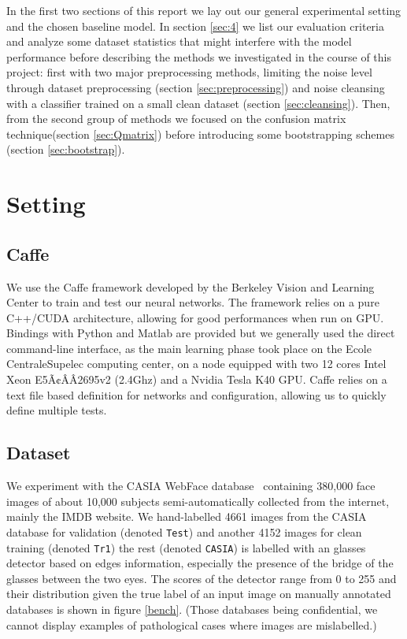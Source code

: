 \documentclass[a4paper]{article}
\begin{document}
    In the first two sections of this report we lay out our general experimental setting and the chosen baseline model. In section \ref{sec:4} we list our evaluation criteria and analyze some dataset statistics that might interfere with the model performance before describing the methods we investigated in the course of this project: first with two major preprocessing methods, limiting the noise level through dataset preprocessing (section \ref{sec:preprocessing}) and noise cleansing with a classifier trained on a small clean dataset (section \ref{sec:cleansing}). Then, from the second group of methods we focused on the confusion matrix technique\cite{Sukhbaatar:Qk8RHYrX}(section \ref{sec:Qmatrix}) before introducing some bootstrapping schemes (section \ref{sec:bootstrap}). 

\section{Setting}

	\subsection{Caffe}
	We use the Caffe framework \cite{jia2014caffe} developed by the Berkeley Vision and Learning Center to train and test our neural networks. The framework relies on a pure C++/CUDA architecture, allowing for good performances when run on GPU. Bindings with Python and Matlab are provided but we generally used the direct command-line interface, as the main learning phase took place on the Ecole CentraleSupelec computing center, on a node equipped with two 12 cores Intel Xeon E5Ã¢ÂÂ2695v2 (2.4Ghz) and a Nvidia Tesla K40 GPU. Caffe relies on a text file based definition for networks and configuration, allowing us to quickly define multiple tests.
		
	\subsection{Dataset}
	We experiment with the CASIA WebFace database~\cite{yi2014learning} containing 380,000 face images of about 10,000 subjects semi-automatically collected from the internet, mainly the IMDB website. We hand-labelled 4661 images from the CASIA database for validation (denoted \texttt{Test}) and another 4152 images for clean training (denoted \texttt{Tr1}) the rest (denoted \texttt{CASIA}) is labelled with an glasses detector based on edges information, especially the presence of the bridge of the glasses between the two eyes. The scores of the detector range from 0 to 255 and their distribution given the true label of an input image on manually annotated databases is shown in figure \ref{bench}. (Those databases being confidential, we cannot display examples of pathological cases where images are mislabelled.)
	
\end{document}
